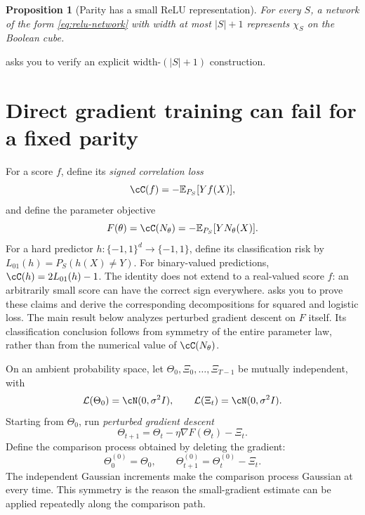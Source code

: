 \documentclass[11pt,twoside]{article}
\newcommand{\E}{\mathbb E}
\newcommand{\Law}{\mathcal L}
\newtheorem{proposition}[theorem]{Proposition}
\theoremstyle{definition}
\theoremstyle{remark}
\begin{document}
\begin{proposition}[Parity has a small ReLU representation]
\label{prop:parity-representation}
For every $S$, a network of the form \cref{eq:relu-network} with width at
most $|S|+1$ represents $\chi_S$ on the Boolean cube.
\end{proposition}

 asks you to verify an explicit
width-$(|S|+1)$ construction.

\section{Direct gradient training can fail for a fixed parity}
\label{sec:parity-result}

For a score $f$, define its \emph{signed correlation loss}
\[
\cC(f)=-\E_{P_S}[Yf(X)],
\]
and define the parameter objective
\begin{equation}
F(\theta)=\cC(N_\theta)=-\E_{P_S}[Y N_\theta(X)].
\label{eq:correlation-objective}
\end{equation}
For a hard predictor $h:\{-1,1\}^d\to\{-1,1\}$, define its classification
risk by $L_{01}(h)=P_S(h(X)\ne Y)$. For binary-valued predictions,
$\cC(h)=2L_{01}(h)-1$. The identity does not extend to a real-valued score
$f$: an arbitrarily small score can have the correct sign everywhere.
 asks you to prove these claims and derive the
corresponding decompositions for squared and logistic loss. The main result
below analyzes perturbed gradient descent on $F$ itself. Its classification
conclusion follows from symmetry of the entire parameter law, rather than
from the numerical value of $\cC(N_\theta)$.

On an ambient probability space, let $\Theta_0,\Xi_0,\ldots,\Xi_{T-1}$ be
mutually independent, with
\[
 \Law(\Theta_0)=\cN(0,\sigma^2I),
 \qquad
 \Law(\Xi_t)=\cN(0,\sigma^2I).
\]
Starting from $\Theta_0$, run \emph{perturbed gradient descent}
\begin{equation}
\Theta_{t+1}=\Theta_t-\eta\nabla F(\Theta_t)-\Xi_t.
\label{eq:perturbed-gd}
\end{equation}
Define the comparison process obtained by deleting the gradient:
\begin{equation}
\Theta^{(0)}_0=\Theta_0,
\qquad
\Theta^{(0)}_{t+1}=\Theta^{(0)}_t-\Xi_t.
\label{eq:gaussian-walk}
\end{equation}
The independent Gaussian increments make the comparison process Gaussian at
every time. This symmetry is the reason the small-gradient estimate can be
applied repeatedly along the comparison path.
\end{document}

